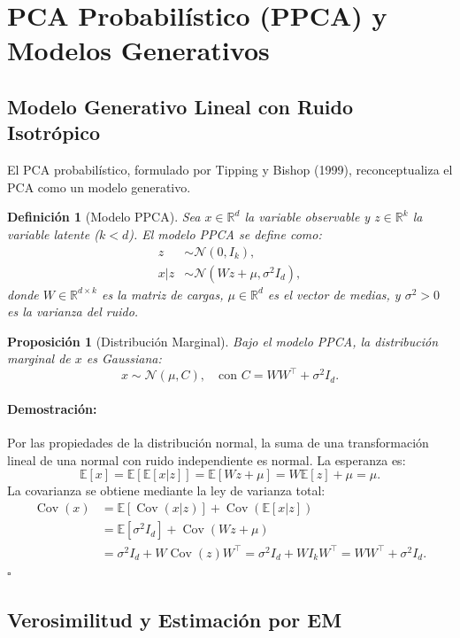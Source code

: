 \documentclass[11pt]{article}
\theoremstyle{plain}
\newtheorem{proposition}[theorem]{Proposición}
\newtheorem{definition}[theorem]{Definición}
\newenvironment{proof}{\paragraph{Demostración:}}{\hfill$\square$}
\newcommand{\Cov}{\operatorname{Cov}}
\begin{document}
\section{PCA Probabilístico (PPCA) y Modelos Generativos}

\subsection{Modelo Generativo Lineal con Ruido Isotrópico}

El PCA probabilístico, formulado por Tipping y Bishop (1999), reconceptualiza el PCA como un modelo generativo.

\begin{definition}[Modelo PPCA]
Sea $x \in \mathbb{R}^d$ la variable observable y $z \in \mathbb{R}^k$ la variable latente ($k < d$). El modelo PPCA se define como:
\[
\begin{aligned}
z &\sim \mathcal{N}(0, I_k), \\
x | z &\sim \mathcal{N}(W z + \mu, \sigma^2 I_d),
\end{aligned}
\]
donde $W \in \mathbb{R}^{d \times k}$ es la matriz de cargas, $\mu \in \mathbb{R}^d$ es el vector de medias, y $\sigma^2 > 0$ es la varianza del ruido.
\end{definition}

\begin{proposition}[Distribución Marginal]
Bajo el modelo PPCA, la distribución marginal de $x$ es Gaussiana:
\[
x \sim \mathcal{N}(\mu, C), \quad \text{con } C = WW^\top + \sigma^2 I_d.
\]
\end{proposition}

\begin{proof}
Por las propiedades de la distribución normal, la suma de una transformación lineal de una normal con ruido independiente es normal. La esperanza es:
\[
\mathbb{E}[x] = \mathbb{E}[\mathbb{E}[x|z]] = \mathbb{E}[Wz + \mu] = W\mathbb{E}[z] + \mu = \mu.
\]
La covarianza se obtiene mediante la ley de varianza total:
\[
\begin{aligned}
\Cov(x) &= \mathbb{E}[\Cov(x|z)] + \Cov(\mathbb{E}[x|z]) \\
&= \mathbb{E}[\sigma^2 I_d] + \Cov(Wz + \mu) \\
&= \sigma^2 I_d + W \Cov(z) W^\top = \sigma^2 I_d + W I_k W^\top = WW^\top + \sigma^2 I_d.
\end{aligned}
\]
\end{proof}

\subsection{Verosimilitud y Estimación por EM}
\end{document}
